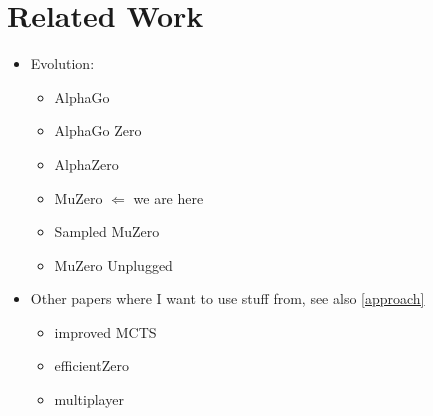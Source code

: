 \chapter{Related Work}

\begin{itemize}
    \item Evolution:
    \begin{itemize}
        \item AlphaGo
        \item AlphaGo Zero \cite{alphago_zero}
        \item AlphaZero \cite{alphazero}
        \item MuZero \cite{muzero} $\Longleftarrow$ we are here
        \item Sampled MuZero
        \item MuZero Unplugged
    \end{itemize}
    \item Other papers where I want to use stuff from, see also \ref{approach}
    \begin{itemize}
        \item improved MCTS \cite{mcts_po}
        \item efficientZero \cite{efficientzero}
        \item multiplayer 
    \end{itemize}
\end{itemize}
